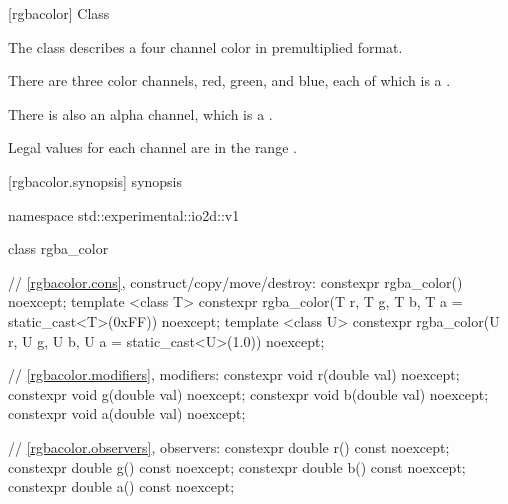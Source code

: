  [rgbacolor] {Class }

\pnum
{}%
The class  describes a four channel color in premultiplied format.

\pnum
There are three color channels, red, green, and blue, each of which is a .

\pnum
There is also an alpha channel, which is a .

\pnum
Legal values for each channel are in the range .

%
 [rgbacolor.synopsis] { synopsis}

\begin{codeblock}
namespace std::experimental::io2d::v1 {
  class rgba_color {
    // \ref{rgbacolor.cons}, construct/copy/move/destroy:
    constexpr rgba_color() noexcept;
    template <class T>
    constexpr rgba_color(T r, T g, T b, T a = static_cast<T>(0xFF)) noexcept;
    template <class U>
    constexpr rgba_color(U r, U g, U b, U a = static_cast<U>(1.0)) noexcept;
  
    // \ref{rgbacolor.modifiers}, modifiers:
    constexpr void r(double val) noexcept;
    constexpr void g(double val) noexcept;
    constexpr void b(double val) noexcept;
    constexpr void a(double val) noexcept;
    
    // \ref{rgbacolor.observers}, observers:
    constexpr double r() const noexcept;
    constexpr double g() const noexcept;
    constexpr double b() const noexcept;
    constexpr double a() const noexcept;
    
}}
\end{codeblock}
